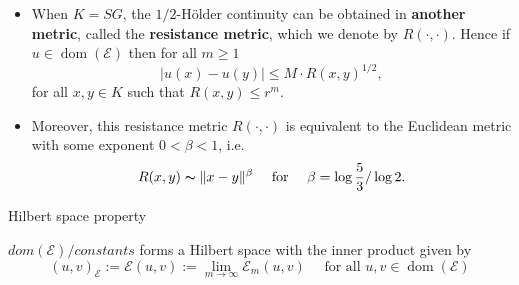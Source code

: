 \begin{frame}
\begin{itemize}
\item When $K=SG$, the $1/2$-Hölder continuity can be obtained in \textbf{another metric}, called the \textbf{resistance metric}, which we denote by $R(\cdot,\cdot)$. Hence if $u\in \operatorname{dom}(\mathcal{E})$ then for all $m\geq 1$
\begin{equation}
    \lvert u(x)-u(y)\rvert \leq M\cdot R(x,y)^{1/2}, 
\end{equation}
for all $x,y \in K$ such that $R(x,y)\leq r^{m}$.

\item Moreover, this resistance metric $R(\cdot,\cdot)$ is equivalent to the Euclidean metric with some exponent $0<\beta<1$, i.e. 
\begin{equation}
R(x,y)\thicksim \lVert x-y \rVert^{\beta} \quad \text{ for } \quad \beta=\log \frac{5}{3}/\log 2. 
\end{equation}
\end{itemize}
\end{frame}

\begin{frame}{Hilbert space property}
\begin{theorem}
    $dom(\mathcal{E})/constants$ forms a Hilbert space with the inner product given by 
    \begin{equation}\label{inner prod}
        (u,v)_{\mathcal{E}}:=\mathcal{E}(u,v):=\lim_{m\rightarrow \infty}\mathcal{E}_m(u,v) \quad \text{ for all } u,v \in \operatorname{dom}(\mathcal{E})
    \end{equation}
\end{theorem}
\end{frame}

